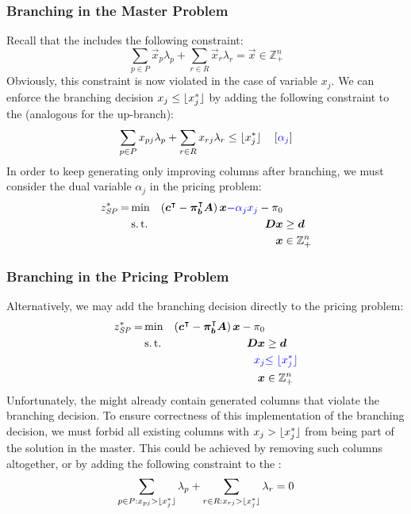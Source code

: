 \subsubsection{Branching in the Master Problem}
Recall that the \MP{} includes the following constraint:
\begin{equation}
\sum_{p \in P} \vec{x}_p \lambda_p + \sum_{r \in R} \vec{x}_r \lambda_r = \vec{x} \in \mathbb{Z}_+^n
\end{equation}
Obviously, this constraint is now violated in the case of variable $x_j$. We can enforce the branching decision $x_j \leq \lfloor x_j^*\rfloor$ by adding the following constraint to the \MP{} (analogous for the up-branch):
\begin{equation}
\sum_{p \in P} x_{pj} \lambda_p + \sum_{r \in R} x_{rj} \lambda_r \leq \lfloor x_j^*\rfloor \quad \left[{\color{blue} \alpha_j }\right]
\end{equation}
In order to keep generating only improving columns after branching, we must consider the dual variable $\alpha_j$ in the pricing problem:
\begin{equation}
\begin{aligned}
z^*_\SP{} = &\min & \left( \vec{c}\transpose - \vec{\pi}_\vec{b}\transpose \mat{A} \right) \vec{x} {\color{blue} - \alpha_j x_j} - \pi_0 & \\
&\st & \mat{D} \vec{x} & \geq \vec{d} \\
&& \vec{x} & \in \mathbb{Z}_+^n
\end{aligned}
\end{equation}

\subsubsection{Branching in the Pricing Problem}
Alternatively, we may add the branching decision directly to the pricing problem:
\begin{equation}
\begin{aligned}
z^*_\SP{} = &\min & \left( \vec{c}\transpose - \vec{\pi}_\vec{b}\transpose \mat{A} \right) \vec{x} - \pi_0 & \\
&\st & \mat{D} \vec{x} & \geq \vec{d} \\
&& {\color{blue} x_j} & {\color{blue} \leq \floor{x_j^*}}\\
&& \vec{x} & \in \mathbb{Z}_+^n
\end{aligned}
\end{equation}
Unfortunately, the \RMP{} might already contain generated columns that violate the branching decision. To ensure correctness of this implementation of the branching decision, we must forbid all existing columns with $x_j > \lfloor x_j^*\rfloor$ from being part of the solution in the master. This could be achieved by removing such columns altogether, or by adding the following constraint to the \MP{}:
\begin{equation}
\sum_{p \in P: x_{pj} > \lfloor x_j^*\rfloor} \lambda_p + \sum_{r \in R: x_{rj} > \lfloor x_j^*\rfloor} \lambda_r = 0
\end{equation}

